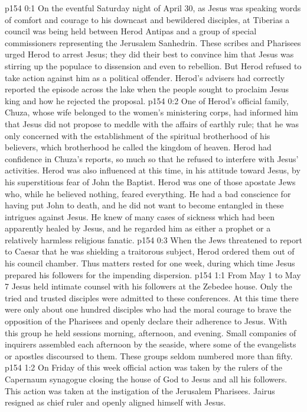 \author{Midwayer Commission}
\vs p154 0:1 On the eventful Saturday night of April 30, as Jesus was speaking words of comfort and courage to his downcast and bewildered disciples, at Tiberias a council was being held between Herod Antipas and a group of special commissioners representing the Jerusalem Sanhedrin. These scribes and Pharisees urged Herod to arrest Jesus; they did their best to convince him that Jesus was stirring up the populace to dissension and even to rebellion. But Herod refused to take action against him as a political offender. Herod’s advisers had correctly reported the episode across the lake when the people sought to proclaim Jesus king and how he rejected the proposal.
\vs p154 0:2 One of Herod’s official family, Chuza, whose wife belonged to the women’s ministering corps, had informed him that Jesus did not propose to meddle with the affairs of earthly rule; that he was only concerned with the establishment of the spiritual brotherhood of his believers, which brotherhood he called the kingdom of heaven. Herod had confidence in Chuza’s reports, so much so that he refused to interfere with Jesus’ activities. Herod was also influenced at this time, in his attitude toward Jesus, by his superstitious fear of John the Baptist. Herod was one of those apostate Jews who, while he believed nothing, feared everything. He had a bad conscience for having put John to death, and he did not want to become entangled in these intrigues against Jesus. He knew of many cases of sickness which had been apparently healed by Jesus, and he regarded him as either a prophet or a relatively harmless religious fanatic.
\vs p154 0:3 When the Jews threatened to report to Caesar that he was shielding a traitorous subject, Herod ordered them out of his council chamber. Thus matters rested for one week, during which time Jesus prepared his followers for the impending dispersion.
\vs p154 1:1 From May 1 to May 7 Jesus held intimate counsel with his followers at the Zebedee house. Only the tried and trusted disciples were admitted to these conferences. At this time there were only about one hundred disciples who had the moral courage to brave the opposition of the Pharisees and openly declare their adherence to Jesus. With this group he held sessions morning, afternoon, and evening. Small companies of inquirers assembled each afternoon by the seaside, where some of the evangelists or apostles discoursed to them. These groups seldom numbered more than fifty.
\vs p154 1:2 On Friday of this week official action was taken by the rulers of the Capernaum synagogue closing the house of God to Jesus and all his followers. This action was taken at the instigation of the Jerusalem Pharisees. Jairus resigned as chief ruler and openly aligned himself with Jesus.
